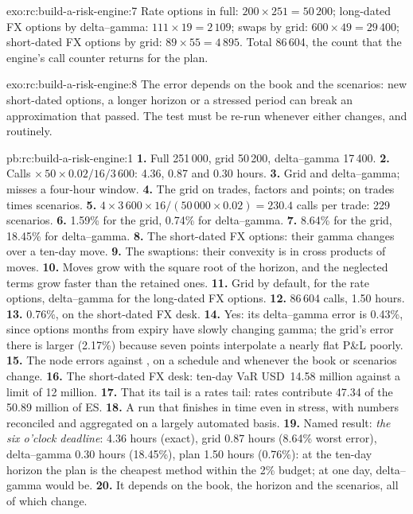 \begin{solution}{exo:rc:build-a-risk-engine:7}
Rate options in full: $200\times251 = 50\,200$; long-dated FX options by delta--gamma: $111\times19 = 2\,109$; swaps
by grid: $600\times49 = 29\,400$; short-dated FX options by grid: $89\times55 = 4\,895$. Total 86\,604, the count that the
engine's call counter returns for the plan.
\end{solution}

\begin{solution}{exo:rc:build-a-risk-engine:8}
The error depends on the book and the scenarios: new short-dated options, a longer horizon or a stressed
period can break an approximation that passed. The test must be re-run whenever either changes, and
routinely.
\end{solution}

\begin{solution}{pb:rc:build-a-risk-engine:1}
\textbf{1.} Full 251\,000, grid 50\,200, delta--gamma 17\,400.
\textbf{2.} Calls $\times\,50\times0.02/16/3\,600$: 4.36, 0.87 and 0.30 hours.
\textbf{3.} Grid and delta--gamma;  misses a four-hour window.
\textbf{4.} The grid on trades, factors and points;  on trades times scenarios.
\textbf{5.} $4\times3\,600\times16/(50\,000\times0.02) = 230.4$ calls per trade: 229 scenarios.
\textbf{6.} 1.59\% for the grid, 0.74\% for delta--gamma.
\textbf{7.} 8.64\% for the grid, 18.45\% for delta--gamma.
\textbf{8.} The short-dated FX options: their gamma changes over a ten-day move.
\textbf{9.} The swaptions: their convexity is in cross products of  moves.
\textbf{10.} Moves grow with the square root of the horizon, and the neglected terms grow faster than the
retained ones.
\textbf{11.} Grid by default,  for the rate options, delta--gamma for the long-dated FX options.
\textbf{12.} 86\,604 calls, 1.50 hours.
\textbf{13.} 0.76\%, on the short-dated FX desk.
\textbf{14.} Yes: its delta--gamma error is 0.43\%, since options months from expiry have slowly changing gamma;
the grid's error there is larger (2.17\%) because seven points interpolate a nearly flat P\&L poorly.
\textbf{15.} The node errors against , on a schedule and whenever the book or scenarios change.
\textbf{16.} The short-dated FX desk: ten-day VaR USD~14.58 million against a limit of 12 million.
\textbf{17.} That its tail is a rates tail: rates contribute 47.34 of the 50.89 million of ES.
\textbf{18.} A run that finishes in time even in stress, with numbers reconciled and aggregated on a largely
automated basis.
\textbf{19.} Named result: \emph{the six o'clock deadline}:  4.36 hours (exact), grid 0.87 hours
(8.64\% worst error), delta--gamma 0.30 hours (18.45\%), plan 1.50 hours (0.76\%): at the ten-day horizon the plan
is the cheapest method within the 2\% budget; at one day, delta--gamma would be.
\textbf{20.} It depends on the book, the horizon and the scenarios, all of which change.
\end{solution}

